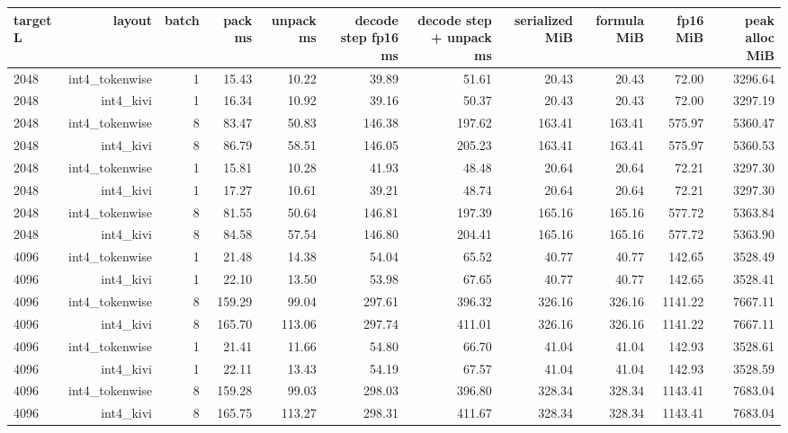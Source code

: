 \begin{tabular}{lrrrrrrrrrr}
\toprule
target L & layout & batch & pack ms & unpack ms & decode step fp16 ms & decode step + unpack ms & serialized MiB & formula MiB & fp16 MiB & peak alloc MiB \\
\midrule
2048 & int4\_tokenwise & 1 & 15.43 & 10.22 & 39.89 & 51.61 & 20.43 & 20.43 & 72.00 & 3296.64 \\
2048 & int4\_kivi & 1 & 16.34 & 10.92 & 39.16 & 50.37 & 20.43 & 20.43 & 72.00 & 3297.19 \\
2048 & int4\_tokenwise & 8 & 83.47 & 50.83 & 146.38 & 197.62 & 163.41 & 163.41 & 575.97 & 5360.47 \\
2048 & int4\_kivi & 8 & 86.79 & 58.51 & 146.05 & 205.23 & 163.41 & 163.41 & 575.97 & 5360.53 \\
2048 & int4\_tokenwise & 1 & 15.81 & 10.28 & 41.93 & 48.48 & 20.64 & 20.64 & 72.21 & 3297.30 \\
2048 & int4\_kivi & 1 & 17.27 & 10.61 & 39.21 & 48.74 & 20.64 & 20.64 & 72.21 & 3297.30 \\
2048 & int4\_tokenwise & 8 & 81.55 & 50.64 & 146.81 & 197.39 & 165.16 & 165.16 & 577.72 & 5363.84 \\
2048 & int4\_kivi & 8 & 84.58 & 57.54 & 146.80 & 204.41 & 165.16 & 165.16 & 577.72 & 5363.90 \\
4096 & int4\_tokenwise & 1 & 21.48 & 14.38 & 54.04 & 65.52 & 40.77 & 40.77 & 142.65 & 3528.49 \\
4096 & int4\_kivi & 1 & 22.10 & 13.50 & 53.98 & 67.65 & 40.77 & 40.77 & 142.65 & 3528.41 \\
4096 & int4\_tokenwise & 8 & 159.29 & 99.04 & 297.61 & 396.32 & 326.16 & 326.16 & 1141.22 & 7667.11 \\
4096 & int4\_kivi & 8 & 165.70 & 113.06 & 297.74 & 411.01 & 326.16 & 326.16 & 1141.22 & 7667.11 \\
4096 & int4\_tokenwise & 1 & 21.41 & 11.66 & 54.80 & 66.70 & 41.04 & 41.04 & 142.93 & 3528.61 \\
4096 & int4\_kivi & 1 & 22.11 & 13.43 & 54.19 & 67.57 & 41.04 & 41.04 & 142.93 & 3528.59 \\
4096 & int4\_tokenwise & 8 & 159.28 & 99.03 & 298.03 & 396.80 & 328.34 & 328.34 & 1143.41 & 7683.04 \\
4096 & int4\_kivi & 8 & 165.75 & 113.27 & 298.31 & 411.67 & 328.34 & 328.34 & 1143.41 & 7683.04 \\
\bottomrule
\end{tabular}

